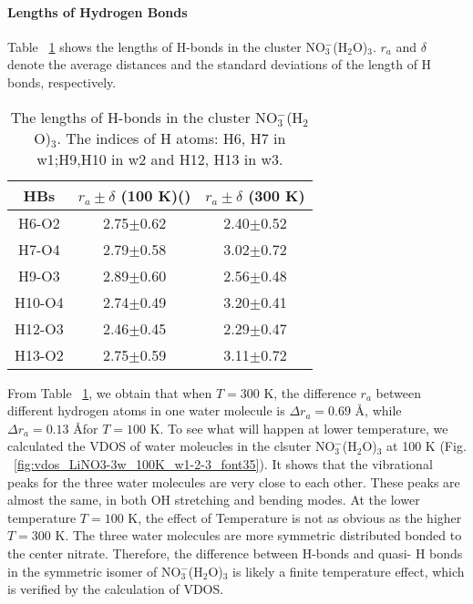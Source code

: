 \paragraph{Lengths of Hydrogen Bonds}
Table ~\ref{tab:3_nitrate_bond} shows the lengths of H-bonds in the cluster NO$_3^-$(H$_2$O)$_3$. $r_a$ and $\delta$ denote the average distances and the standard deviations of the length of H bonds, respectively. 
\begin{table}
\centering
\caption{\label{tab:3_nitrate_bond}%
The lengths of H-bonds in the cluster NO$_3^-$(H$_2$O)$_3$. The indices of H atoms: H6, H7 in w1;H9,H10 in w2 and H12, H13 in w3.} 
\begin{tabular}{ccc} \\\toprule
 HBs& $r_a\pm\delta$ (100 K)(\A) & \multicolumn{1}{c}{ $r_a\pm\delta$ (300 K)}(\A)\\
\hline
 H6-O2 &2.75$\pm$0.62& 2.40$\pm$0.52 \\
 H7-O4 &2.79$\pm$0.58& 3.02$\pm$0.72 \\
 H9-O3 &2.89$\pm$0.60 &2.56$\pm$0.48 \\
 H10-O4 &2.74$\pm$0.49&3.20$\pm$0.41 \\
 H12-O3 &2.46$\pm$0.45&2.29$\pm$0.47 \\
 H13-O2 &2.75$\pm$0.59 &3.11$\pm$0.72
\end{tabular}
\end{table}
From Table ~\ref{tab:3_nitrate_bond}, we obtain that when $T=300$ K, the difference $r_a$ between different hydrogen atoms in one water molecule is
$\Delta{r_a}=0.69$ \AA, while $\Delta{r_a}=0.13$ \AA for $T=100$ K.
To see what will happen at lower temperature, 
we calculated the VDOS of water moleucles in the clsuter NO$_3^-$(H$_2$O)$_3$ at 100 K (Fig. ~\ref{fig:vdos_LiNO3-3w_100K_w1-2-3_font35}). 
It shows that the vibrational peaks for the three water molecules are very close to each other. 
These peaks are almost the same, in both OH stretching and bending modes.  
At the lower temperature $T=100$ K, the effect of Temperature is not as obvious as the higher $T=300$ K. 
The three water molecules are more symmetric distributed bonded to the center nitrate.
Therefore, the difference between H-bonds and quasi- H bonds in the symmetric isomer of NO$_3^-$(H$_2$O)$_3$ is likely a finite temperature effect, 
which is verified by the calculation of VDOS.

